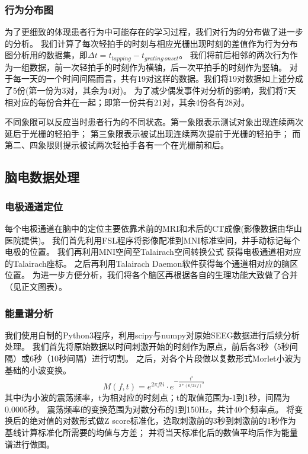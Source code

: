 \subsubsection{行为分布图}
为了更细致的体现患者行为中可能存在的学习过程，我们对行为的分布做了进一步的分析。
我们计算了每次轻拍手的时刻与相应光栅出现时刻的差值作为行为分布图分析用的数据集，即$\Delta t = t_{tapping} - t_{grating\ onset}$。
我们将前后相邻的两次行为作为一组数据，前一次轻拍手的时刻作为横轴，后一次平拍手的时刻作为竖轴。
对于每一天的一个时间间隔而言，共有19对这样的数据。我们将19对数据如上述分成了5份(第一份为3对，其余为4对)。
为了减少偶发事件对分析的影响，我们将7天相对应的每份合并在一起；即第一份共有21对，其余4份各有28对。

不同象限可以反应当时患者行为的不同状态。第一象限表示测试对象出现连续两次延后于光栅的轻拍手；
第三象限表示被试出现连续两次提前于光栅的轻拍手；
而第二、四象限则提示被试两次轻拍手各有一个在光栅前和后。

\subsection{脑电数据处理}

\subsubsection{电极通道定位}

每个电极通道在脑中的定位主要依靠术前的MRI和术后的CT成像(影像数据由华山医院提供)。
我们首先利用FSL程序\cite{fsl}将影像配准到MNI标准空间，并手动标记每个电极的位置。
我们再利用MNI空间至Talairach空间转换公式\cite{bioelectromagnetism} %
获得电极通道相对应的Talairach座标。
之后再利用Talairach Daemon软件\cite{talairach_daemon}获得每个通道相对应的脑区位置。
为进一步方便分析，我们将各个脑区再根据各自的生理功能大致做了合并（见正文图表）。%

\subsubsection{能量谱分析}

我们使用自制的Python3程序，利用scipy\cite{scipy}与numpy\cite{numpy,oliphant2007python}对原始SEEG数据进行后续分析处理。
我们首先将原始数据以时间刺激开始的时刻作为原点，前后各3秒（5秒间隔）或6秒（10秒间隔）进行切割。
之后，对各个片段做以复数形式Morlet小波为基础的小波变换。
\begin{equation}
    M(f, t) = e ^ {2 \pi f t i} \cdot e ^ {-\frac{t^2}{2 * (6 / 2 \pi f)^2}}
\end{equation}
其中f为小波的震荡频率，t为相对应的时刻点；t的取值范围为-1到1秒，间隔为0.0005秒。
震荡频率f的变换范围为对数分布的1到150Hz，共计40个频率点。
将变换后的绝对值的对数形式做Z score标准化，选取刺激前的3秒到刺激前的1秒作为基线计算标准化所需要的均值与方差；
并将当天标准化后的数值平均后作为能量谱进行做图。

